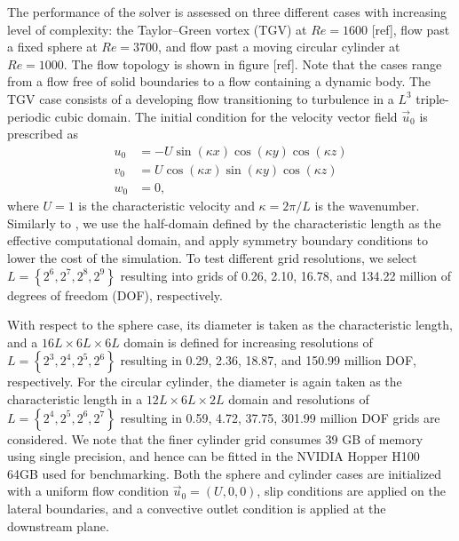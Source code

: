 \documentclass[final,3p,times]{elsarticle}
\begin{document}
The performance of the solver is assessed on three different cases with increasing level of complexity: the Taylor--Green vortex (TGV) at $Re=1600$ [ref], flow past a fixed sphere at $Re=3700$, and flow past a moving circular cylinder at $Re=1000$. The flow topology is shown in figure [ref]. Note that the cases range from a flow free of solid boundaries to a flow containing a dynamic body. The TGV case consists of a developing flow transitioning to turbulence in a $L^3$ triple-periodic cubic domain. The initial condition for the velocity vector field $\vec{u}_0$ is prescribed as
\begin{align}
u_0 &= -U\sin(\kappa x)\cos(\kappa y)\cos(\kappa z) \\
v_0 &= U\cos(\kappa x)\sin(\kappa y)\cos(\kappa z) \\
w_0 &= 0,
\end{align}
where $U=1$ is the characteristic velocity and $\kappa=2\pi/L$ is the wavenumber. Similarly to \cite{Dairay2017}, we use the half-domain defined by the characteristic length as the effective computational domain, and apply symmetry boundary conditions to lower the cost of the simulation. To test different grid resolutions, we select $L=\left\{2^6,2^7,2^8,2^9\right\}$ resulting into grids of 0.26, 2.10, 16.78, and 134.22 million of degrees of freedom (DOF), respectively.

With respect to the sphere case, its diameter is taken as the characteristic length, and a $16L\times6L\times6L$ domain is defined for increasing resolutions of $L=\left\{2^3,2^4,2^5,2^6\right\}$ resulting in 0.29, 2.36, 18.87, and 150.99 million DOF, respectively. For the circular cylinder, the diameter is again taken as the characteristic length in a $12L\times6L\times2L$ domain and resolutions of $L=\left\{2^4,2^5,2^6,2^7\right\}$ resulting in 0.59, 4.72, 37.75, 301.99 million DOF grids are considered. We note that the finer cylinder grid consumes 39 GB of memory using single precision, and hence can be fitted in the NVIDIA Hopper H100 64GB used for benchmarking. Both the sphere and cylinder cases are initialized with a uniform flow condition $\vec{u}_0=(U,0,0)$, slip conditions are applied on the lateral boundaries, and a convective outlet condition is applied at the downstream plane.
\end{document}
